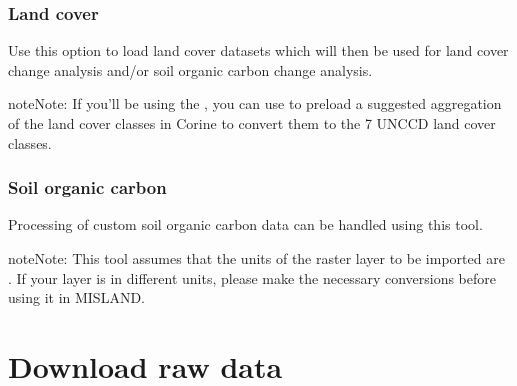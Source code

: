 \documentclass[letterpaper,10pt,english]{sphinxmanual}
\begin{document}
\subsection{Land cover}
\label{\detokenize{Qgis_Plugin/load_data:id2}}
\sphinxAtStartPar
Use this option to load land cover datasets which will then be used for land
cover change analysis and/or soil organic carbon change analysis.


\begin{sphinxadmonition}{note}{Note:}
\sphinxAtStartPar
If you’ll be using the  , you can use
to pre\sphinxhyphen{}load a suggested aggregation of the land cover classes in Corine to convert them to the 7 UNCCD land cover classes.
\end{sphinxadmonition}


\subsection{Soil organic carbon}
\label{\detokenize{Qgis_Plugin/load_data:id3}}
\sphinxAtStartPar
Processing of custom soil organic carbon data can be handled using this
tool.

\begin{sphinxadmonition}{note}{Note:}
\sphinxAtStartPar
This tool assumes that the units of the raster layer to be imported
are . If your layer is in
different units, please make the necessary conversions before using it in
MISLAND.
\end{sphinxadmonition}

\sphinxstepscope


\chapter{Download raw data}
\label{\detokenize{Qgis_Plugin/Download_data:download-raw-data}}\label{\detokenize{Qgis_Plugin/Download_data::doc}}


\end{document}
